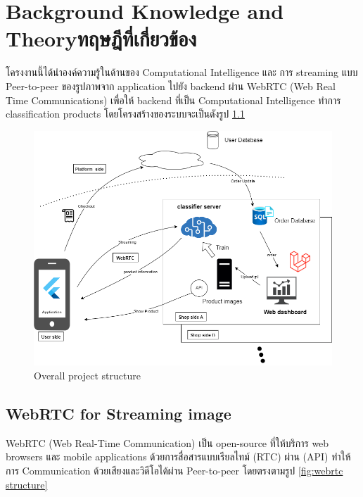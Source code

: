 \chapter{\ifenglish Background Knowledge and Theory\else ทฤษฎีที่เกี่ยวข้อง\fi}

โครงงานนี้ได้นำองค์ความรู้ในด้านของ Computational Intelligence และ การ streaming แบบ Peer-to-peer   
ของรูปภาพจาก application ไปยัง backend ผ่าน WebRTC (Web Real Time Communications) เพื่อให้ backend 
ที่เป็น Computational Intelligence ทำการ classification products โดยโครงสร้างของระบบจะเป็นดังรูป \ref{fig:Overall project structure}
\begin{figure}[h]
  \begin{center}
  \vspace{0.5cm}\includegraphics[scale=0.5]{pic/overall_2.png}
  \end{center}
  
  \caption[Overall project structure]{Overall project structure}
  \label{fig:Overall project structure}
  \end{figure}
  
  \newpage
 
\section{WebRTC for Streaming image}
WebRTC (Web Real-Time Communication) เป็น open-source  ที่ให้บริการ  web browsers
 และ mobile applications ด้วยการสื่อสารแบบเรียลไทม์ (RTC) ผ่าน (API)  
 ทำให้การ Communication ด้วยเสียงและวิดีโอได้ผ่าน  Peer-to-peer   โดยตรงตามรูป \ref{fig:webrtc structure}
 
